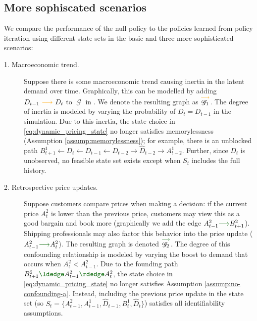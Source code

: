 \documentclass[12pt,a4paper]{article}
\theoremstyle{definition}
\DeclareMathOperator{\gG}{\mathscr{G}}
\begin{document}
\subsection{More sophiscated scenarios}

We compare the performance of the null policy to the policies learned
from policy iteration using different state sets in the basic and
three more sophisticated scenarios:
\begin{description}
  \item[1. Macroeconomic trend.] Suppose there is some macroeconomic
    trend causing inertia in the latent demand over time. Graphically,
    this can be modelled by adding $D_{t-1} ~
    \textcolor{graphOrange}{\longrightarrow} ~ D_t$ to $\gG$ in
    . We denote the resulting graph as
    $\overset{\textcolor{graphOrange}{\longrightarrow}}{\gG_1}$. The
    degree of inertia is modeled by varying the probability of
    $D_{t} = D_{t-1}$ in the simulation. Due to this inertia, the
    state choice in \eqref{eq:dynamic_pricing_state} no longer
    satisfies memorylessness (Assumption
    \ref*{assump:memorylessness}); for example, there is an unblocked path
    $B^1_{t+1} \leftarrow D_{t} \leftarrow D_{t-1} \leftarrow D_{t-2}
    \rightarrow \hat{D}_{t-2} \rightarrow A^1_{t-2}$. Further, since
    $D_t$ is unobserved, no feasible state set
    exists except when $S_t$ includes the full history.

  \item[2. Retrospective price updates.] Suppose customers compare
    prices when making a decision: if the
    current price $A^2_{t}$ is lower than the previous price,
    customers may view this as a good bargain and book more
    (graphically we add the edge $A^2_{t-1} \textcolor{graphGreen}{
      \longrightarrow} B^2_{t+1}$). Shipping professionals may also
    factor this behavior into the price update ($A^2_{t-1}
    \textcolor{graphGreen}{\longrightarrow} A^2_{t}$).
  The resulting graph is denoted
  $\overset{\textcolor{graphGreen}{\longrightarrow}}{\gG_2}$. The
  degree of this confounding relationship is modeled by varying the
  boost to demand that occurs when $A^2_{t} < A^2_{t-1}$. Due to the
  founding path $B^2_{t+1} \textcolor{graphGreen}{\ldedge} A^2_{t-1}
  \textcolor{graphGreen}{\rdedge} A^2_t$, the
    state choice in \eqref{eq:dynamic_pricing_state} no longer
    satisfies Assumption \ref{assump:no-confounding-a}. Instead,
    including the previous price update in the state set (so $S_t =
    \{A^2_{t-1}, A^1_{t-1}, \hat{D}_{t-1}, B^1_t, \hat{D}_t\}$)
    satisfies all identifiability assumptions.


\end{description}
\end{document}
